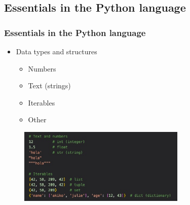 \subsection{Essentials in the Python language}

\begin{frame}\frametitle{Essentials in the Python language}

   \begin{itemize}
      \item Data types and structures
      \begin{itemize}
         \item Numbers
         \item Text (strings)
         \item Iterables
         \item Other
      \end{itemize}
   \end{itemize}

   \begin{figure}[H]
      \includegraphics[width=8cm]{../images/illustrations/python_types.jpg}
   \end{figure}
\end{frame}


